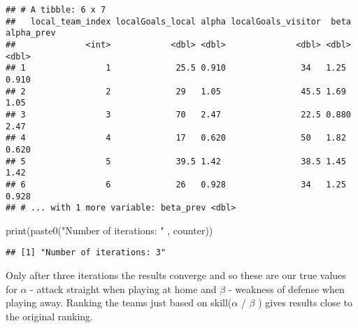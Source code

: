 \documentclass[
]{article}
\newenvironment{Shaded}{\begin{snugshade}}{\end{snugshade}}
\newcommand{\AttributeTok}[1]{\textcolor[rgb]{0.77,0.63,0.00}{#1}}
\newcommand{\CommentTok}[1]{\textcolor[rgb]{0.56,0.35,0.01}{\textit{#1}}}
\newcommand{\DecValTok}[1]{\textcolor[rgb]{0.00,0.00,0.81}{#1}}
\newcommand{\FunctionTok}[1]{\textcolor[rgb]{0.00,0.00,0.00}{#1}}
\newcommand{\NormalTok}[1]{#1}
\newcommand{\OtherTok}[1]{\textcolor[rgb]{0.56,0.35,0.01}{#1}}
\newcommand{\SpecialCharTok}[1]{\textcolor[rgb]{0.00,0.00,0.00}{#1}}
\newcommand{\StringTok}[1]{\textcolor[rgb]{0.31,0.60,0.02}{#1}}
\begin{document}
\begin{verbatim}
## # A tibble: 6 x 7
##   local_team_index localGoals_local alpha localGoals_visitor  beta alpha_prev
##              <int>            <dbl> <dbl>              <dbl> <dbl>      <dbl>
## 1                1             25.5 0.910               34   1.25       0.910
## 2                2             29   1.05                45.5 1.69       1.05 
## 3                3             70   2.47                22.5 0.880      2.47 
## 4                4             17   0.620               50   1.82       0.620
## 5                5             39.5 1.42                38.5 1.45       1.42 
## 6                6             26   0.928               34   1.25       0.928
## # ... with 1 more variable: beta_prev <dbl>
\end{verbatim}

\begin{Shaded}
\begin{Highlighting}[]
\FunctionTok{print}\NormalTok{(}\FunctionTok{paste0}\NormalTok{(}\StringTok{"Number of iterations: "}\NormalTok{ , counter))}
\end{Highlighting}
\end{Shaded}

\begin{verbatim}
## [1] "Number of iterations: 3"
\end{verbatim}

Only after three iterations the results converge and so these are our
true values for \(\alpha\) - attack straight when playing at home and
\(\beta\) - weakness of defense when playing away. Ranking the teams
just based on skill(\(\alpha\) / \(\beta\) ) gives results close to the
original ranking.

\begin{Shaded}
\end{Shaded}
\end{document}
